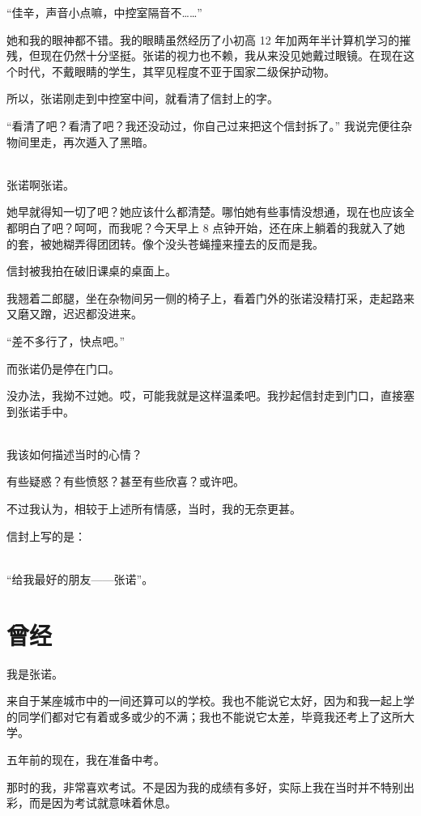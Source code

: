 \documentclass[UTF8]{ctexart}
\begin{document}
“佳辛，声音小点嘛，中控室隔音不……”

她和我的眼神都不错。我的眼睛虽然经历了小初高 12 年加两年半计算机学习的摧残，但现在仍然十分坚挺。张诺的视力也不赖，我从来没见她戴过眼镜。在现在这个时代，不戴眼睛的学生，其罕见程度不亚于国家二级保护动物。

所以，张诺刚走到中控室中间，就看清了信封上的字。

“看清了吧？看清了吧？我还没动过，你自己过来把这个信封拆了。” 我说完便往杂物间里走，再次遁入了黑暗。

~\\

张诺啊张诺。

她早就得知一切了吧？她应该什么都清楚。哪怕她有些事情没想通，现在也应该全都明白了吧？呵呵，而我呢？今天早上 8 点钟开始，还在床上躺着的我就入了她的套，被她糊弄得团团转。像个没头苍蝇撞来撞去的反而是我。

信封被我拍在破旧课桌的桌面上。

我翘着二郎腿，坐在杂物间另一侧的椅子上，看着门外的张诺没精打采，走起路来又磨又蹭，迟迟都没进来。

“差不多行了，快点吧。”

而张诺仍是停在门口。

没办法，我拗不过她。哎，可能我就是这样温柔吧。我抄起信封走到门口，直接塞到张诺手中。

~\\

我该如何描述当时的心情？

有些疑惑？有些愤怒？甚至有些欣喜？或许吧。

不过我认为，相较于上述所有情感，当时，我的无奈更甚。

信封上写的是：

~\\

“给我最好的朋友——张诺”。

\section{曾经}

我是张诺。

来自于某座城市中的一间还算可以的学校。我也不能说它太好，因为和我一起上学的同学们都对它有着或多或少的不满；我也不能说它太差，毕竟我还考上了这所大学。

五年前的现在，我在准备中考。

那时的我，非常喜欢考试。不是因为我的成绩有多好，实际上我在当时并不特别出彩，而是因为考试就意味着休息。
\end{document}
